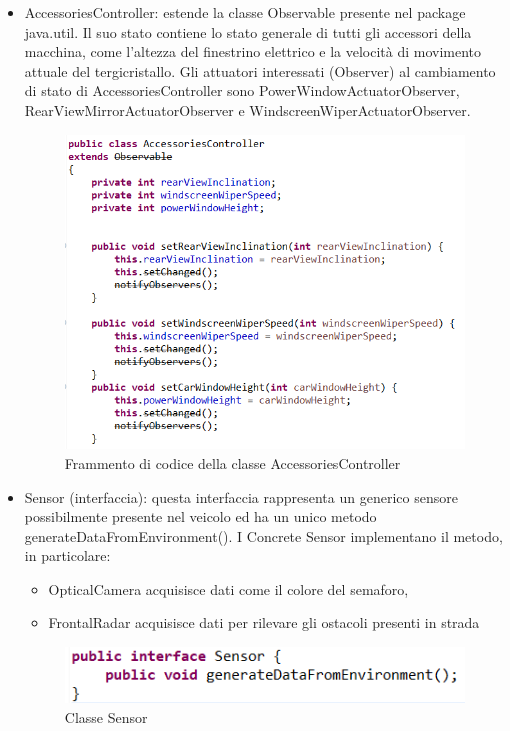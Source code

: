 \documentclass{article}
\begin{document}
\begin{itemize}
\item AccessoriesController: estende la classe Observable presente nel package java.util. Il suo stato contiene lo stato generale di tutti gli accessori della macchina, come l'altezza del finestrino elettrico e la velocità di movimento attuale del tergicristallo. Gli attuatori interessati (Observer) al cambiamento di stato di AccessoriesController sono PowerWindowActuatorObserver, RearViewMirrorActuatorObserver e WindscreenWiperActuatorObserver.
\begin{figure} [H]
\begin{center}
\includegraphics[scale=0.8]{AccessoriesController.png}
\end{center}
\caption{Frammento di codice della classe AccessoriesController}
\end{figure}


\item Sensor (interfaccia):  questa interfaccia rappresenta un generico sensore possibilmente presente nel veicolo ed ha un unico metodo generateDataFromEnvironment(). I Concrete Sensor implementano il metodo, in particolare:
    \begin{itemize}
    \item  OpticalCamera acquisisce dati come il colore del semaforo, 
    \item  FrontalRadar acquisisce dati per rilevare gli ostacoli presenti in strada
    \end{itemize}
\begin{figure} [H]
\begin{center}
\includegraphics[scale=0.8]{Sensor.png}
\end{center}
\caption{Classe Sensor}
\end{figure}
    

\end{itemize}
\end{document}
